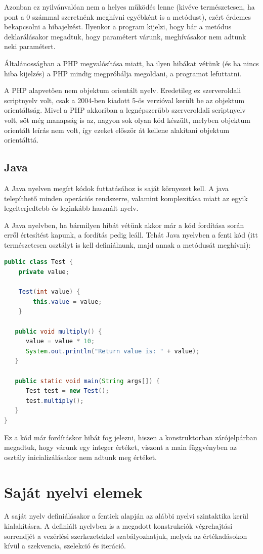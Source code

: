 Azonban ez nyilvánvalóan nem a helyes működés lenne (kivéve természetesen, ha pont a 0 számmal szeretnénk meghívni egyébként is a metódust), ezért érdemes bekapcsolni a hibajelzést. Ilyenkor a program kijelzi, hogy bár a metódus deklarálásakor megadtuk, hogy paramétert várunk, meghívásakor nem adtunk neki paramétert.

Általánosságban a PHP megvalósítása miatt, ha ilyen hibákat vétünk (és ha nincs hiba kijelzés) a PHP mindig megpróbálja megoldani, a programot lefuttatni.

A PHP alapvetően nem objektum orientált nyelv. Eredetileg ez szerveroldali scriptnyelv volt, csak a 2004-ben kiadott 5-ös verzióval került be az objektum orientáltság. Mivel a PHP akkoriban a legnépszerűbb szerveroldali scriptnyelv volt, sőt még manapság is az, nagyon sok olyan kód készült, melyben objektum orientált leírás nem volt, így ezeket először át kellene alakítani objektum orientálttá.

\subsection{Java}

A Java nyelven megírt kódok futtatásához is saját környezet kell. A java telepíthető minden operációs rendszerre, valamint komplexitása miatt az egyik legelterjedtebb és leginkább használt nyelv.

A Java nyelvben, ha bármilyen hibát vétünk akkor már a kód fordítása során erről értesítést kapunk, a fordítás pedig leáll. Tehát Java nyelvben a fenti kód (itt természetesen osztályt is kell definiálnunk, majd annak a metódusát meghívni):

\begin{lstlisting}[language=Java]
public class Test {
    private value;
    
    Test(int value) {
        this.value = value;
    }

   public void multiply() {
      value = value * 10;
      System.out.println("Return value is: " + value);
   }

   public static void main(String args[]) {
      Test test = new Test();
      test.multiply();
   }
}
\end{lstlisting}

Ez a kód már fordításkor hibát fog jelezni, hiszen a konstruktorban zárójelpárban megadtuk, hogy várunk egy integer értéket, viszont a main függvényben az osztály inicializálásakor nem adtunk meg értéket. 

\section{Saját nyelvi elemek}
A saját nyelv definiálásakor a fentiek alapján az alábbi nyelvi szintaktika kerül kialakításra.
A definiált nyelvben is a megadott konstrukciók végrehajtási sorrendjét a vezérlési szerkezetekkel szabályozhatjuk, melyek az értékadásokon kívül a szekvencia, szelekció és iteráció.

